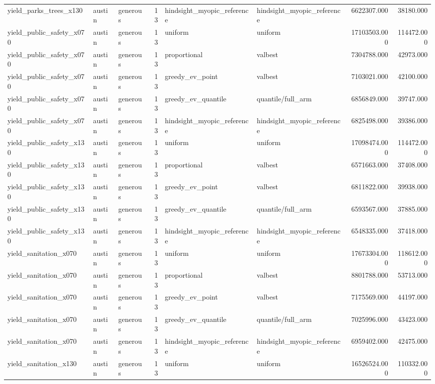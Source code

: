 \begin{tabular}{lllrllrr}
yield\_parks\_trees\_x130 & austin & generous & 13 & hindsight\_myopic\_reference & hindsight\_myopic\_reference & 6622307.000 & 38180.000 \\
yield\_public\_safety\_x070 & austin & generous & 13 & uniform & uniform & 17103503.000 & 114472.000 \\
yield\_public\_safety\_x070 & austin & generous & 13 & proportional & valbest & 7304788.000 & 42973.000 \\
yield\_public\_safety\_x070 & austin & generous & 13 & greedy\_ev\_point & valbest & 7103021.000 & 42100.000 \\
yield\_public\_safety\_x070 & austin & generous & 13 & greedy\_ev\_quantile & quantile/full\_arm & 6856849.000 & 39747.000 \\
yield\_public\_safety\_x070 & austin & generous & 13 & hindsight\_myopic\_reference & hindsight\_myopic\_reference & 6825498.000 & 39386.000 \\
yield\_public\_safety\_x130 & austin & generous & 13 & uniform & uniform & 17098474.000 & 114472.000 \\
yield\_public\_safety\_x130 & austin & generous & 13 & proportional & valbest & 6571663.000 & 37408.000 \\
yield\_public\_safety\_x130 & austin & generous & 13 & greedy\_ev\_point & valbest & 6811822.000 & 39938.000 \\
yield\_public\_safety\_x130 & austin & generous & 13 & greedy\_ev\_quantile & quantile/full\_arm & 6593567.000 & 37885.000 \\
yield\_public\_safety\_x130 & austin & generous & 13 & hindsight\_myopic\_reference & hindsight\_myopic\_reference & 6548335.000 & 37418.000 \\
yield\_sanitation\_x070 & austin & generous & 13 & uniform & uniform & 17673304.000 & 118612.000 \\
yield\_sanitation\_x070 & austin & generous & 13 & proportional & valbest & 8801788.000 & 53713.000 \\
yield\_sanitation\_x070 & austin & generous & 13 & greedy\_ev\_point & valbest & 7175569.000 & 44197.000 \\
yield\_sanitation\_x070 & austin & generous & 13 & greedy\_ev\_quantile & quantile/full\_arm & 7025996.000 & 43423.000 \\
yield\_sanitation\_x070 & austin & generous & 13 & hindsight\_myopic\_reference & hindsight\_myopic\_reference & 6959402.000 & 42475.000 \\
yield\_sanitation\_x130 & austin & generous & 13 & uniform & uniform & 16526524.000 & 110332.000 \\

\end{tabular}
